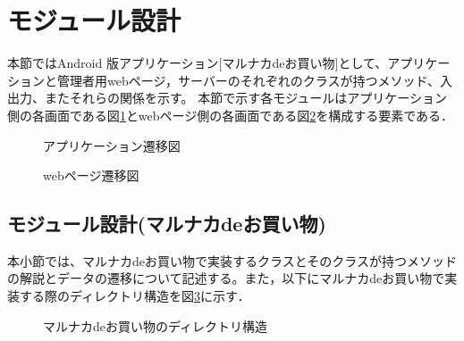 \documentclass[a4j]{jarticle}
\begin{document}
\section{モジュール設計}
本節ではAndroid 版アプリケーション[マルナカdeお買い物]として、アプリケーションと管理者用webページ，サーバーのそれぞれのクラスが持つメソッド、入出力、またそれらの関係を示す。
本節で示す各モジュールはアプリケーション側の各画面である図\ref{tab:senni}とwebページ側の各画面である図\ref{tab:senni2}を構成する要素である．
\begin{figure}[H]
\begin{center}
\caption{アプリケーション遷移図}
\label{tab:senni}
\end{center}
\end{figure}
\begin{figure}[H]
\begin{center}
\caption{webページ遷移図}
\label{tab:senni2}
\end{center}
\end{figure}

\subsection{モジュール設計(マルナカdeお買い物)}
本小節では、マルナカdeお買い物で実装するクラスとそのクラスが持つメソッドの解説とデータの遷移について記述する。また，以下にマルナカdeお買い物で実装する際のディレクトリ構造を図\ref{tab:directory}に示す．
\begin{figure}[H]
\begin{center}
\caption{マルナカdeお買い物のディレクトリ構造}
\label{tab:directory}
\end{center}
\end{figure}
\end{document}
